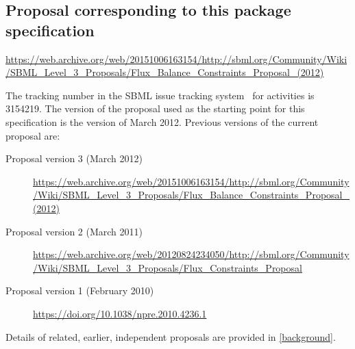 \subsection{Proposal corresponding to this package specification}


  \vspace*{1ex}\small
  \url{https://web.archive.org/web/20151006163154/http://sbml.org/Community/Wiki/SBML_Level_3_Proposals/Flux_Balance_Constraints_Proposal_(2012)}
  \vspace*{1ex}

The tracking number in the SBML issue tracking system~\citep{tracker}
for \FBCPackage activities is 3154219. The version of the proposal used
as the starting point for this specification is the version of March
2012. Previous versions of the current proposal are:

\begin{description}
  \item[Proposal version 3 (March 2012)]
  \item [] {\small\url{https://web.archive.org/web/20151006163154/http://sbml.org/Community/Wiki/SBML_Level_3_Proposals/Flux_Balance_Constraints_Proposal_(2012)}}
  \item[Proposal version 2 (March 2011)]
  \item [] {\small\url{https://web.archive.org/web/20120824234050/http://sbml.org/Community/Wiki/SBML_Level_3_Proposals/Flux_Constraints_Proposal}}
  \item[Proposal version 1 (February 2010)]
  \item [] {\small\url{https://doi.org/10.1038/npre.2010.4236.1}}
\end{description}

Details of related, earlier, independent proposals are provided in \ref{background}.

